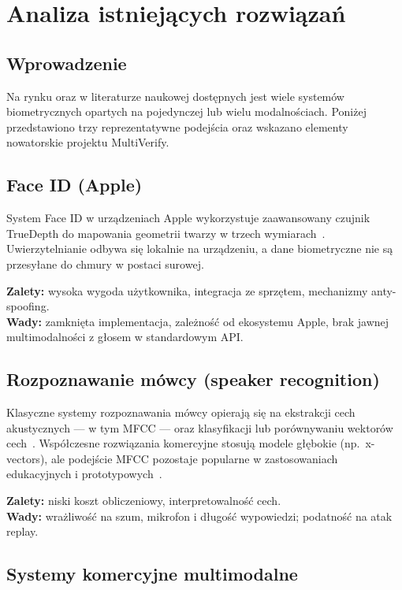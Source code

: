 \chapter{Analiza istniejących rozwiązań}
\label{cha:analiza}

\section{Wprowadzenie}

Na rynku oraz w literaturze naukowej dostępnych jest wiele systemów biometrycznych opartych na pojedynczej lub wielu modalnościach. Poniżej przedstawiono trzy reprezentatywne podejścia oraz wskazano elementy nowatorskie projektu MultiVerify.

\section{Face ID (Apple)}

System Face ID w urządzeniach Apple wykorzystuje zaawansowany czujnik TrueDepth do mapowania geometrii twarzy w trzech wymiarach~\cite{apple2024faceid}. Uwierzytelnianie odbywa się lokalnie na urządzeniu, a dane biometryczne nie są przesyłane do chmury w postaci surowej.

\textbf{Zalety:} wysoka wygoda użytkownika, integracja ze sprzętem, mechanizmy anty-spoofing.\\
\textbf{Wady:} zamknięta implementacja, zależność od ekosystemu Apple, brak jawnej multimodalności z głosem w standardowym API.

\section{Rozpoznawanie mówcy (speaker recognition)}

Klasyczne systemy rozpoznawania mówcy opierają się na ekstrakcji cech akustycznych --- w tym MFCC --- oraz klasyfikacji lub porównywaniu wektorów cech~\cite{davis1980comparison}. Współczesne rozwiązania komercyjne stosują modele głębokie (np.\ x-vectors), ale podejście MFCC pozostaje popularne w zastosowaniach edukacyjnych i prototypowych~\cite{librosa2024}.

\textbf{Zalety:} niski koszt obliczeniowy, interpretowalność cech.\\
\textbf{Wady:} wrażliwość na szum, mikrofon i długość wypowiedzi; podatność na atak replay.

\section{Systemy komercyjne multimodalne}

